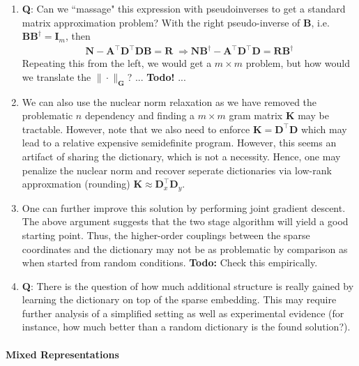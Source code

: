 \documentclass{article}
\newcommand{\mN}{{\mathbf N}}
\newcommand{\mR}{{\mathbf R}}
\newcommand{\mG}{{\mathbf G}}
\newcommand{\mK}{{\mathbf K}}
\newcommand{\mD}{{\mathbf D}}
\newcommand{\mA}{{\mathbf A}}
\newcommand{\mB}{{\mathbf B}}
\begin{document}
\begin{enumerate} 
\item \textbf{Q}: Can we ``massage" this expression with pseudoinverses to get a standard matrix approximation problem? With the right pseudo-inverse of $\mB$, i.e.~$\mB \mB^\dagger = \mathbf I_{m}$, then 
\begin{align}
 \mN -  \mA^\top \mD^\top  \mD \mB = \mR \; \Longrightarrow  \mN \mB^\dagger - \mA^\top \mD^\top \mD =  \mR \mB^\dagger 
\end{align}
Repeating this from the left, we would get a $m \times m$ problem, but how would we translate the $\| \cdot\|_\mG$?
... \textbf{Todo!} ...
\item We can  also use the nuclear norm relaxation as we have removed the problematic $n$ dependency and finding a $m \times m$ gram matrix $\mK$ may be tractable. However, note that we also need to enforce $\mK = \mD^\top \mD$ which may lead to a relative expensive semidefinite program. However, this seems an artifact  of sharing the dictionary, which is not a necessity. Hence, one may penalize the nuclear norm and recover seperate dictionaries via low-rank approxmation (rounding) $\mK \approx \mD_x^\top \mD_y$. 
\item One can further improve this solution by performing joint gradient descent. The above argument suggests that the two stage algorithm will yield a good starting point. Thus, the higher-order couplings between the sparse coordinates and the dictionary may not be as problematic by comparison as when started from random conditions. \textbf{Todo:} Check this empirically. 
\item \textbf{Q}: There is the question of how much additional structure is really gained by learning the dictionary on top of the sparse embedding. This may require further analysis of a simplified setting as well as experimental evidence (for instance, how much better than a random dictionary is the found solution?).
\end{enumerate}

\paragraph{Mixed Representations}
\end{document}
